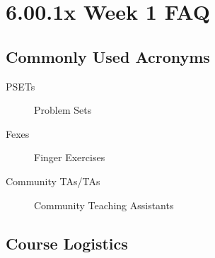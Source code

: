 \documentclass{article}
\begin{document}
	
	\section*{\Huge6.00.1x Week 1 FAQ}
	
		\subsection*{\LARGE Commonly Used Acronyms}
		
			\begin{description}
				\item[PSETs] Problem Sets
				
				\item[Fexes] Finger Exercises
				
				\item[Community TAs/TAs] Community Teaching Assistants
			\end{description}
		
		\subsection*{\LARGE Course Logistics}
		
\end{document}
